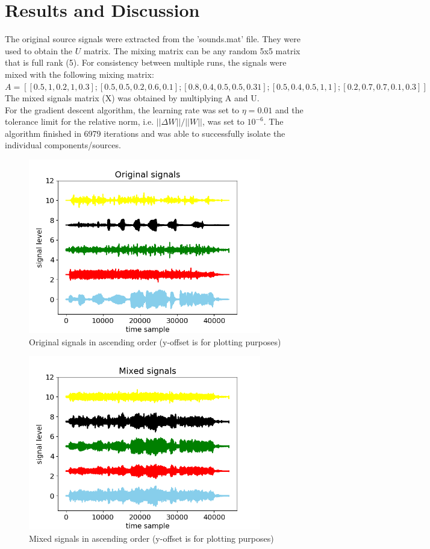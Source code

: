 \documentclass[journal,onecolumn,12pt]{IEEEtran}
\begin{document}
\section{Results and Discussion}
The original source signals were extracted from the 'sounds.mat' file. They were used to obtain the $U$ matrix. The mixing matrix can be any random 5x5 matrix that is full rank (5). For consistency between multiple runs, the signals were mixed with the following mixing matrix:\vspace{12pt}\\
$A = [[0.5, 1, 0.2, 1, 0.3];[0.5, 0.5, 0.2, 0.6, 0.1];[0.8, 0.4, 0.5, 0.5, 0.31];[0.5, 0.4, 0.5, 1, 1];[0.2, 0.7, 0.7, 0.1, 0.3]]$\vspace{12pt}\\
The mixed signals matrix (X) was obtained by multiplying A and U. \\
For the gradient descent algorithm, the learning rate was set to $\eta = 0.01$ and the tolerance limit for the relative norm, i.e. $||\Delta W||/||W||$, was set to $10^{-6}$. The algorithm finished in 6979 iterations and was able to successfully isolate the individual components/sources.
\begin{figure}[h]
\centering
\includegraphics[width=4in]{images/Original_signals.png}
\caption{Original signals in ascending order (y-offset is for plotting purposes)}
\label{fig:orig_sigs}
\end{figure}

\begin{figure}[h]
\centering
\includegraphics[width=4in]{images/Mixed_signals.png}
\caption{Mixed signals in ascending order (y-offset is for plotting purposes)}
\label{fig:mix_sigs}
\end{figure}
\end{document}
